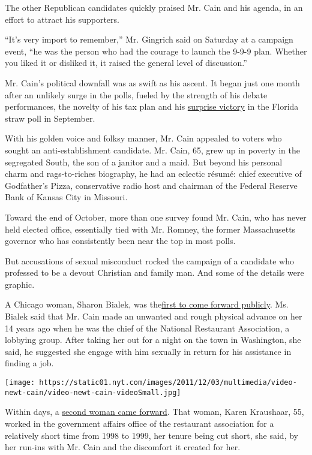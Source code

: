 The other Republican candidates quickly praised Mr. Cain and his agenda,
in an effort to attract his supporters.

``It's very import to remember,'' Mr. Gingrich said on Saturday at a
campaign event, ``he was the person who had the courage to launch the
9-9-9 plan. Whether you liked it or disliked it, it raised the general
level of discussion.''

Mr. Cain's political downfall was as swift as his ascent. It began just
one month after an unlikely surge in the polls, fueled by the strength
of his debate performances, the novelty of his tax plan and his
\href{http://thecaucus.blogs.nytimes.com/2011/09/24/herman-cain-wins-florida-straw-poll/}{surprise
victory} in the Florida straw poll in September.

With his golden voice and folksy manner, Mr. Cain appealed to voters who
sought an anti-establishment candidate. Mr. Cain, 65, grew up in poverty
in the segregated South, the son of a janitor and a maid. But beyond his
personal charm and rags-to-riches biography, he had an eclectic résumé:
chief executive of Godfather's Pizza, conservative radio host and
chairman of the Federal Reserve Bank of Kansas City in Missouri.

Toward the end of October, more than one survey found Mr. Cain, who has
never held elected office, essentially tied with Mr. Romney, the former
Massachusetts governor who has consistently been near the top in most
polls.

But accusations of sexual misconduct rocked the campaign of a candidate
who professed to be a devout Christian and family man. And some of the
details were graphic.

A Chicago woman, Sharon Bialek, was
the\href{http://www.nytimes.com/2011/11/08/us/politics/woman-accuses-cain-of-groping-he-denies-charge.html}{first
to come forward publicly}. Ms. Bialek said that Mr. Cain made an
unwanted and rough physical advance on her 14 years ago when he was the
chief of the National Restaurant Association, a lobbying group. After
taking her out for a night on the town in Washington, she said, he
suggested she engage with him sexually in return for his assistance in
finding a job.

\texttt{[image: https://static01.nyt.com/images/2011/12/03/multimedia/video-newt-cain/video-newt-cain-videoSmall.jpg]}

Within days, a
\href{http://www.nytimes.com/2011/11/09/us/politics/cain-to-respond-to-allegation-after-vowing-to-move-on.html}{second
woman came forward}. That woman, Karen Kraushaar, 55, worked in the
government affairs office of the restaurant association for a relatively
short time from 1998 to 1999, her tenure being cut short, she said, by
her run-ins with Mr. Cain and the discomfort it created for her.


